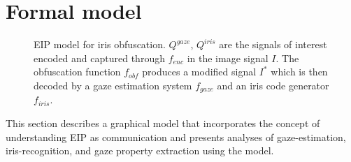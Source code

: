 \section{Formal model}
\begin{figure}
\centering
{}
    
\caption{EIP model for iris obfuscation. $Q^{gaze}$, $Q^{iris}$ are the signals of interest encoded and captured through $f_{enc}$ in the image signal $I$. The obfuscation function $f_{obf}$ produces a modified signal $I^*$ which is then decoded by a gaze estimation system $f_{gaze}$ and an iris code generator $f_{iris}$.}
\label{fig:model}
\end{figure}

This section describes a graphical model that incorporates the concept of understanding EIP as communication and presents analyses of gaze-estimation, iris-recognition, and gaze property extraction using the model.


